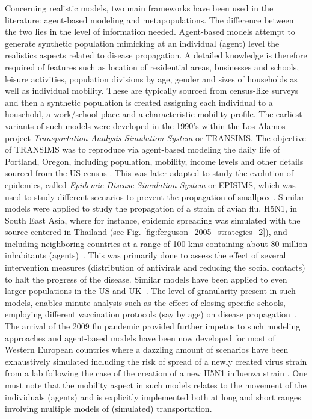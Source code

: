 Concerning realistic models, two main frameworks have been used in the literature: agent-based modeling and metapopulations. The difference between the two lies in the level of information needed. Agent-based models attempt to generate synthetic population mimicking at an individual (agent) level the realistics aspects related to disease propagation. A detailed knowledge is therefore required of features such as location of residential areas, businesses and schools, leisure activities, population divisions by  age, gender and sizes of households as well as individual mobility. These are typically sourced from census-like surveys and then a synthetic population is created assigning each individual to a household, a work/school place and a characteristic mobility profile. The earliest variants of such models were developed in the 1990's within the Los Alamos project \emph{Transportation Analysis Simulation System} or TRANSIMS. The objective of TRANSIMS was to reproduce via agent-based modeling the daily life of Portland, Oregon, including population, mobility, income levels and other details sourced from the US census \cite{simon_1999_simple}. This was later adapted to study the evolution of epidemics, called \emph{Epidemic Disease Simulation System} or EPISIMS, which was used to study different scenarios to prevent the propagation of smallpox \cite{eubank_2004_modelling}. Similar models were applied to study the propagation of a strain of avian flu, H5N1, in South East Asia, where for instance, epidemic spreading was simulated with the source centered in Thailand (see Fig. \ref{fig:ferguson_2005_strategies_2}), and including neighboring countries at a range of 100 kms containing about $80$ million inhabitants (agents)~\cite{ferguson_2005_strategies,longini_2005_containing}. This was primarily done to assess the effect of several intervention measures (distribution of antivirals and reducing the social contacts) to halt the progress of the disease. Similar models have been applied to even larger populations in the US and UK~\cite{ferguson_2006_strategies,germann_2006_mitigation,halloran_2008_modeling,ajelli_2008_impact}. The level of granularity present in such models, enables minute analysis  such as the effect of closing specific schools, employing different vaccination protocols (say by age) on disease propagation~\cite{germann_2006_mitigation,halloran_2008_modeling}. The arrival of the 2009 flu pandemic provided further impetus to such modeling approaches and agent-based models have been now developed for most of Western European countries \cite{ajelli_2010_comparing,ciofi_2008_mitigation,merler_2009_role,merler_2011_determinants} where a dazzling amount of scenarios have been exhaustively simulated including the risk of spread of a newly created virus strain from a lab following the case of the creation of a new H5N1 influenza strain \cite{merler_2013_containing}. One must note that the mobility aspect in such models relates to the movement of the individuals (agents) and is explicitly implemented both at long and short ranges involving multiple models of (simulated) transportation.

